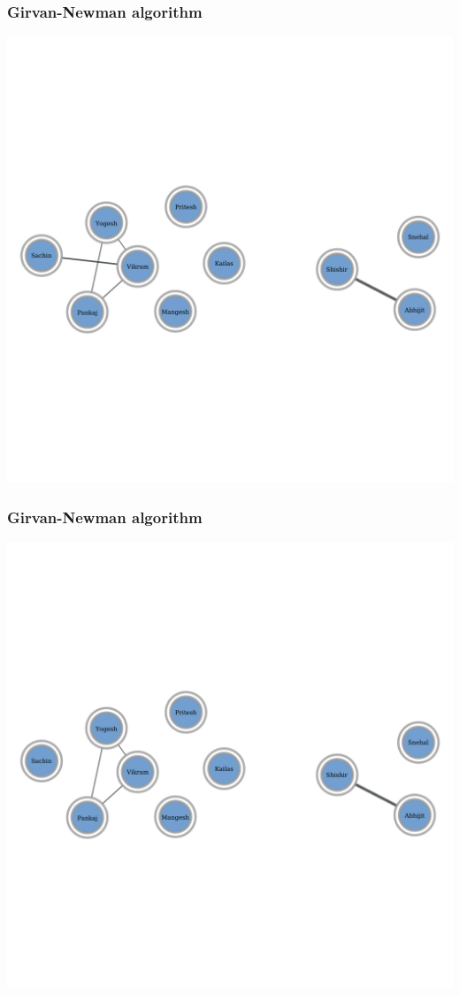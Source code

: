 \documentclass{beamer}
\begin{document}
\begin{frame}
    \frametitle{Girvan-Newman algorithm}
    \centering
    \includegraphics[width=0.8\columnwidth]{gn12.pdf}
\end{frame}
\begin{frame}
    \frametitle{Girvan-Newman algorithm}
    \centering
    \includegraphics[width=0.8\columnwidth]{gn13.pdf}
\end{frame}
\end{document}
